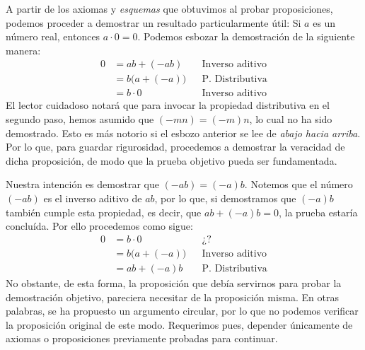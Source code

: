 \documentclass[11pt]{article}
\begin{document}
A partir de los axiomas y \textit{esquemas} que obtuvimos al probar proposiciones, podemos proceder a demostrar un resultado particularmente útil: Si $a$ es un número real, entonces $a\cdot 0 = 0$. Podemos esbozar la demostración de la siguiente manera: \begin{align*}
    0 &= ab + (-ab) && \text{Inverso aditivo}\\
    &= b\bigl(a+(-a)\bigr) && \text{P. Distributiva}\\
    &= b \cdot 0 && \text{Inverso aditivo}
\end{align*}
El lector cuidadoso notará que para invocar la propiedad distributiva en el segundo paso, hemos asumido que $(-mn)=(-m)n$, lo cual no ha sido demostrado. Esto es más notorio si el esbozo anterior se lee de \textit{abajo hacia arriba}. Por lo que, para guardar rigurosidad, procedemos a demostrar la veracidad de dicha proposición, de modo que la prueba objetivo pueda ser fundamentada.

Nuestra intención es demostrar que $(-ab)=(-a)b$. Notemos que el número $(-ab)$ es el inverso aditivo de $ab$, por lo que, si demostramos que $(-a)b$ también cumple esta propiedad, es decir, que $ab+(-a)b=0$, la prueba estaría concluída. Por ello procedemos como sigue:
\begin{align*}
    0 &= b \cdot 0&& \text{¿?}\\
    &= b\bigl(a+(-a)\bigr)&& \text{Inverso aditivo}\\
    &= ab + (-a)b && \text{P. Distributiva}
\end{align*}
No obstante, de esta forma, la proposición que debía servirnos para probar la demostración objetivo, pareciera necesitar de la proposición misma. En otras palabras, se ha propuesto un argumento circular, por lo que no podemos verificar la proposición original de este modo. Requerimos pues, depender únicamente de axiomas o proposiciones previamente probadas para continuar.
\end{document}

